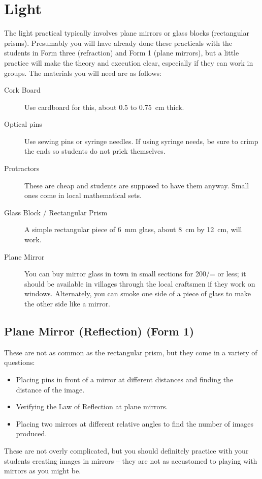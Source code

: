 \section{Light}
The light practical typically involves plane mirrors or glass blocks (rectangular
prisms). Presumably you will have already done these practicals with the students in Form
three (refraction) and Form 1 (plane mirrors), but a little practice will make the theory and
execution clear, especially if they can work in groups. The materials you will need are as
follows:
\begin{description}
\item[Cork Board]{Use cardboard for this, about 0.5 to 0.75~cm thick.}
\item[Optical pins]{Use sewing pins or syringe needles. If using syringe needs, be
sure to crimp the ends so students do not prick themselves.}
\item[Protractors]{These are cheap and students are supposed to have them anyway.
Small ones come in local mathematical sets.}
\item[Glass Block / Rectangular Prism]{A simple rectangular piece of 6~mm glass,
about 8~cm by 12~cm, will work.}
\item[Plane Mirror]{You can buy mirror glass in town in small sections for 200/= or
less; it should be available in villages through the local craftsmen if they work on
windows. Alternately, you can smoke one side of a piece of glass to make the
other side like a mirror.}
\end{description}

\subsection{Plane Mirror (Reflection) (Form 1)}

These are not as common as the rectangular prism, but they come in a variety of
questions:
\begin{itemize}
\item{Placing pins in front of a mirror at different distances and finding the distance of
the image.}
\item{Verifying the Law of Reflection at plane mirrors.}
\item{Placing two mirrors at different relative angles to find the number of images
produced.}
\end{itemize}
These are not overly complicated, but you should definitely practice with your students creating images in
mirrors -- they are not as accustomed to playing with mirrors as you might be.

